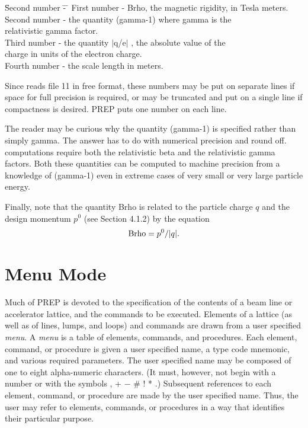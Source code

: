\begin{tabbing}
\indent \= Second number \= - \= \kill \> First number \> - \> Brho, the
magnetic rigidity, in Tesla meters. \\ \> Second number \> - \> the quantity
(gamma-1) where gamma is the \\ \> \> \> relativistic gamma factor.\\ \>
Third number \> - \> the quantity $\mid$q/e$\mid$ , the absolute value of
the\\ \> \> \> charge in units of the electron charge.\\ \> Fourth number
\> - \> the scale length in meters. 
\end{tabbing}
\noindent Since \Mary reads file 11 in free format, these numbers may be
put on separate lines if space for full precision is required, or may be
truncated and put on a single line if compactness is desired. PREP puts one
number on each line.

The reader may be curious why the quantity (gamma-1) is specified rather
than simply gamma. The answer has to do with numerical precision and round
off. \Mary computations require both the relativistic beta and the
relativistic gamma factors. Both these quantities can be computed to
machine precision from a knowledge of (gamma-1) even in extreme cases of
very small or very large particle energy.

Finally, note that the quantity Brho is related to the particle charge $q$ and the design momentum $p^0$ (see Section 4.1.2) by the equation
\begin{equation}
{\rm Brho} = p^0/|q|.
\end{equation}

\section{Menu Mode} Much of PREP is devoted to the specification of the
contents of a beam line or accelerator lattice, and the commands to be
executed. Elements of a lattice (as well as of lines, lumps, and loops) and
commands are drawn from a user specified {\em menu}.  A {\em menu} is a
table of elements, commands, and procedures. Each element, command, or
procedure is given a user specified name, a type code mnemonic, and various
required parameters.  The user specified name may be composed of one to
eight alpha-numeric characters. (It must, however, not begin with a number
or with the symbols , + $-$ \# ! * .) Subsequent references to each
element, command, or procedure are made by the user specified name. Thus,
the user may refer to elements, commands, or procedures in a way that
identifies their particular purpose.


